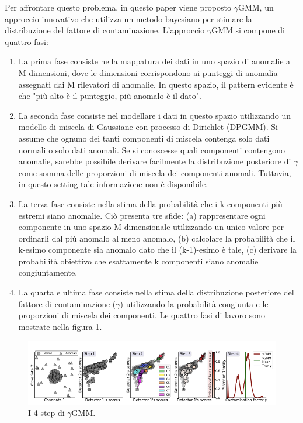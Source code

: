 Per affrontare questo problema, in questo paper viene proposto $\gamma$GMM, un approccio innovativo che utilizza un metodo bayesiano per stimare la distribuzione del fattore di contaminazione.
L'approccio $\gamma$GMM si compone di quattro fasi:
\begin{enumerate}
\item La prima fase consiste nella mappatura dei dati in uno spazio di anomalie a M dimensioni, dove le dimensioni corrispondono ai punteggi di anomalia assegnati dai M rilevatori di anomalie. In questo spazio, il pattern evidente è che "più alto è il punteggio, più anomalo è il dato".
\item La seconda fase consiste nel modellare i dati in questo spazio utilizzando un modello di miscela di Gaussiane con processo di Dirichlet (DPGMM). Si assume che ognuno dei tanti componenti di miscela contenga solo dati normali o solo dati anomali. Se si conoscesse quali componenti contengono anomalie, sarebbe possibile derivare facilmente la distribuzione posteriore di $\gamma$ come somma delle proporzioni di miscela dei componenti anomali. Tuttavia, in questo setting tale informazione non è disponibile.
\item La terza fase consiste nella stima della probabilità che i k componenti più estremi siano anomalie. Ciò presenta tre sfide: (a) rappresentare ogni componente in uno spazio M-dimensionale utilizzando un unico valore per ordinarli dal più anomalo al meno anomalo, (b) calcolare la probabilità che il k-esimo componente sia anomalo dato che il (k-1)-esimo è tale, (c) derivare la probabilità obiettivo che esattamente k componenti siano anomalie congiuntamente.
\item La quarta e ultima fase consiste nella stima della distribuzione posteriore del fattore di contaminazione ($\gamma$) utilizzando la probabilità congiunta e le proporzioni di miscela dei componenti.
Le quattro fasi di lavoro sono mostrate nella figura \ref{ygmm1}.

\end{enumerate}
\begin{figure}[t]
	\centering
	\includegraphics[width=14cm, scale=1]{images/ygmm1}
	\caption{I 4 step di $\gamma$GMM.}
	\label{ygmm1}
\end{figure}

